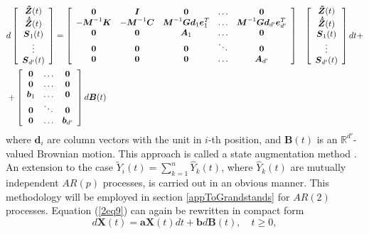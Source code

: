 \documentclass[preprint,12pt,authoryear]{elsarticle}
\newcommand{\bs}[1]{{\boldsymbol{#1}}}
\begin{document}
\begin{eqnarray}
&d\left[\begin{array}{c}
\bs{\tilde{Z}}(t)\\
\bs{\dot{\tilde{Z}}}(t)\\
\bs{S}_1(t)\\
\vdots\\
\bs{S}_{d'}(t)
\end{array}\right]
=
\left[\begin{array}{c c c c c}
\bs{0} & \bs{I} & \bs{0} & \ldots & \bs{0} \\
-\bs{M}^{-1}\bs{K} & -\bs{M}^{-1}\bs{C} & \bs{M}^{-1}\bs{G}\bs{d}_1\bs{e}_1^T & \ldots & \bs{M}^{-1}\bs{G}\bs{d}_{d'}\bs{e}_{d'}^T \\
\bs{0} & \bs{0} & \bs{A}_1 & \ldots & \bs{0} \\
\bs{0} & \bs{0} & \bs{0} & \ddots & \bs{0} \\
\bs{0} & \bs{0} & \bs{0} & \ldots & \bs{A}_{d'} \\
\end{array}\right]&
\left[\begin{array}{c}
\bs{\tilde{Z}}(t)\\
\bs{\dot{\tilde{Z}}}(t)\\
\bs{S}_1(t)\\
\vdots\\
\bs{S}_{d'}(t)
\end{array}\right]dt+\nonumber\\
&+
\left[\begin{array}{c c c}
\bs{0} & \ldots & \bs{0} \\
\bs{0} & \ldots & \bs{0} \\
\bs{b}_1 & \ldots & \bs{0} \\
\bs{0} & \ddots & \bs{0} \\
\bs{0} & \ldots & \bs{b}_{d'} \\
\end{array}\right]d\bs{B}(t)&
\label{2eq9}
\end{eqnarray}
where $\bs{d}_i$ are column vectors with the unit in $i$-th position, and $\bs{B}(t)$ is an $\mathbb{R}^{d'}$-valued Brownian motion. This approach is called a state augmentation method \citep{Grigoriu_stoch}. An extension to the case $\tilde{Y}_i(t)=\sum_{k=1}^n\hat{Y}_k(t)$, where $\hat{Y}_k(t)$ are mutually independent $AR(p)$ processes, is carried out in an obvious manner. This methodology will be employed in section \ref{appToGrandstands} for $AR(2)$ processes. Equation (\ref{2eq9}) can again be rewritten in compact form
\begin{equation}
d\bs{X}(t)=\bs{a}\bs{X}(t)dt+\bs{b}d\bs{B}(t),\quad t\geq 0,
\label{2eq10}
\end{equation}
\end{document}
